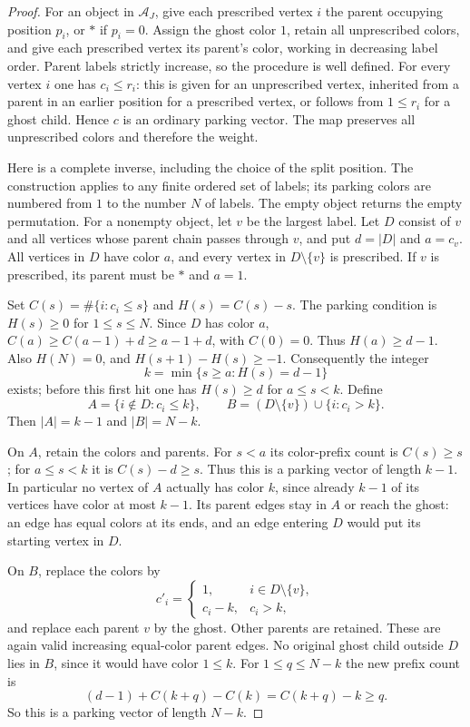 \documentclass[11pt,a4paper]{article}
\theoremstyle{definition}
\theoremstyle{remark}
\begin{document}
\begin{proof}
For an object in $\mathcal A_J$, give each prescribed vertex $i$ the parent
occupying position $p_i$, or $*$ if $p_i=0$. Assign the ghost color $1$,
retain all unprescribed colors, and give each prescribed vertex its
parent's color, working in decreasing label order. Parent labels strictly
increase, so the procedure is well defined. For every vertex $i$ one has
$c_i\le r_i$: this is given for an unprescribed vertex, inherited from a
parent in an earlier position for a prescribed vertex, or follows from
$1\le r_i$ for a ghost child. Hence $c$ is an ordinary parking vector.
The map preserves all unprescribed colors and therefore the weight.

Here is a complete inverse, including the choice of the split position.
The construction applies to any finite ordered set of labels; its parking
colors are numbered from $1$ to the number $N$ of labels. The empty object
returns the empty permutation. For a nonempty object, let $v$ be the
largest label. Let $D$ consist of $v$ and all vertices whose parent chain
passes through $v$, and put $d=|D|$ and $a=c_v$. All vertices in $D$ have
color $a$, and every vertex in $D\setminus\{v\}$ is prescribed. If $v$
is prescribed, its parent must be $*$ and $a=1$.

Set $C(s)=\#\{i:c_i\le s\}$ and $H(s)=C(s)-s$. The parking condition is
$H(s)\ge0$ for $1\le s\le N$. Since $D$ has color $a$,
$C(a)\ge C(a-1)+d\ge a-1+d$, with $C(0)=0$. Thus $H(a)\ge d-1$.
Also $H(N)=0$, and $H(s+1)-H(s)\ge-1$. Consequently the integer
\[
 k=\min\{s\ge a:H(s)=d-1\}
\]
exists; before this first hit one has $H(s)\ge d$ for $a\le s<k$.
Define
\[
 A=\{i\notin D:c_i\le k\},\qquad
 B=(D\setminus\{v\})\cup\{i:c_i>k\}.
\]
Then $|A|=k-1$ and $|B|=N-k$.

On $A$, retain the colors and parents. For $s<a$ its color-prefix count is
$C(s)\ge s$; for $a\le s<k$ it is $C(s)-d\ge s$. Thus this is a parking
vector of length $k-1$. In particular no vertex of $A$ actually has color
$k$, since already $k-1$ of its vertices have color at most $k-1$.
Its parent edges stay in $A$ or reach the ghost: an edge has equal colors
at its ends, and an edge entering $D$ would put its starting vertex in $D$.

On $B$, replace the colors by
\[
 c'_i=\begin{cases}1,&i\in D\setminus\{v\},\\c_i-k,&c_i>k,\end{cases}
\]
and replace each parent $v$ by the ghost. Other parents are retained.
These are again valid increasing equal-color parent edges. No original
ghost child outside $D$ lies in $B$, since it would have color $1\le k$.
For $1\le q\le N-k$ the new prefix count is
\[
 (d-1)+C(k+q)-C(k)=C(k+q)-k\ge q.
\]
So this is a parking vector of length $N-k$.


\end{proof}
\end{document}
